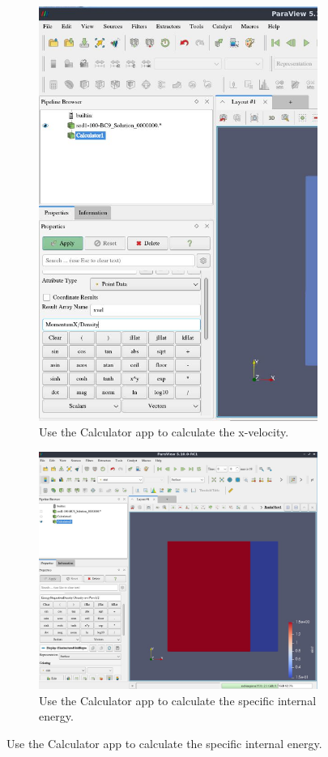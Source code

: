 \begin{appendices}
\begin{figure}
\centering
\begin{subfigure}{.95\textwidth}
  \centering
  \includegraphics[width=.9\linewidth,height=0.9\linewidth,scale=1]{figures/paraviewGrabs/CalculatorXvel.jpg}
  \caption{Use the Calculator app to calculate the x-velocity.}
  \label{fig:CalcXvel}
\end{subfigure}
\begin{subfigure}{.95\textwidth}
  \centering
  \includegraphics[width=.9\linewidth,height=0.9\linewidth,scale=1]{figures/paraviewGrabs/CalculatorEint.jpg}
  \caption{Use the Calculator app to calculate the specific internal energy.}
  \label{fig:CalcEint}
\end{subfigure}
\end{figure}


\end{appendices}
